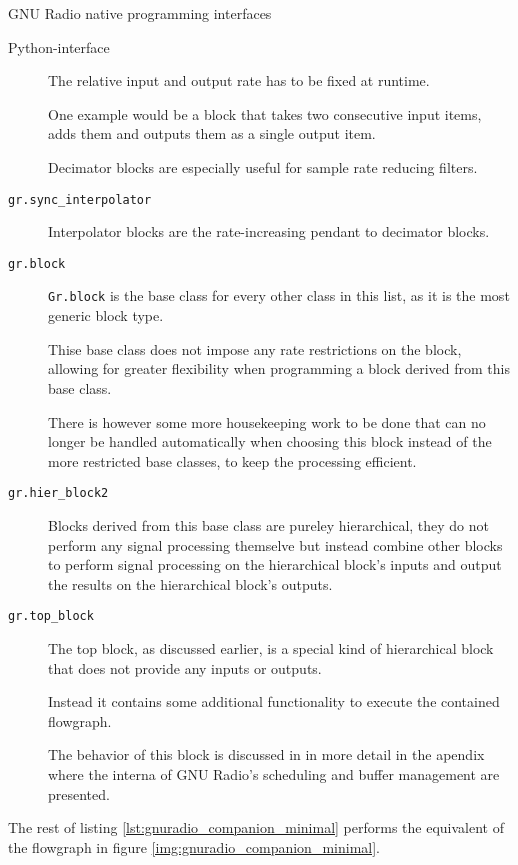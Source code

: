 \begin{subchapter}{GNU Radio native programming interfaces}
\begin{subsubchapter}{Python-interface}
\begin{description}
        The relative input and output rate has to be fixed at runtime.

        One example would be a block that takes two consecutive input
        items, adds them and outputs them as a single output item.

        Decimator blocks are especially useful for
        sample rate reducing filters.

      \item[\texttt{gr.sync\_interpolator}]
        Interpolator blocks are the rate-increasing pendant
        to decimator blocks.

      \item[\texttt{gr.block}]
        \texttt{Gr.block} is the base class for every other class
        in this list, as it is the most generic block type.

        Thise base class does not impose any rate restrictions
        on the block, allowing for greater flexibility when
        programming a block derived from this base class.

        There is however some more housekeeping work to be
        done that can no longer be handled automatically when
        choosing this block instead of the more restricted base classes,
        to keep the processing efficient.

      \item[\texttt{gr.hier\_block2}]
        Blocks derived from this base class are pureley
        hierarchical, they do not perform any signal processing
        themselve but instead combine other blocks to perform
        signal processing on the hierarchical block's inputs and
        output the results on the hierarchical block's outputs.

      \item[\texttt{gr.top\_block}]
        The top block, as discussed earlier, is a special kind of
        hierarchical block that does not provide any inputs or outputs.

        Instead it contains some additional functionality to execute
        the contained flowgraph.

        The behavior of this block is discussed in in more detail in the
        apendix where the interna of GNU Radio's scheduling
        and buffer management are presented.
    \end{description}

    \noindent The rest of listing \ref{lst:gnuradio_companion_minimal}
    performs the equivalent of the flowgraph in figure
    \ref{img:gnuradio_companion_minimal}. \\


\end{subsubchapter}
\end{subchapter}
